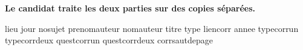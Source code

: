 {\begin{center}
{{\begin{minipage}{\linewidth-3.25cm}
\end{minipage}
	\indexerauteur{}%
	}
	}%
	\newline \smallskip \newline \noindent\textbf{Le candidat traite les deux parties sur des copies séparées.}
	\end{center}\vspace{-0.3cm}
 \indexerquestions{}%
 \compteurquestions{}%
	\clearpage
    }
    	{lieu}			{}
		{jour}			{}
		{nosujet}		{}
		{prenomauteur}	{}
		{nomauteur}		{}
		{titre}			{}
		{type}			{}
		{liencorr}		{}
		{annee}			{}
		{typecorrun}	{}
		{typecorrdeux}	{}
		{questcorrun}	{}
		{questcorrdeux}	{}
		{corrsautdepage}{}

\newcommand{\corrlieu}{\cmdCOR@corr@lieu}
\newcommand{\corrjour}{\cmdCOR@corr@jour}
\newcommand{\corrnosujet}{\cmdCOR@corr@nosujet}
\newcommand{\corrprenomauteur}{\cmdCOR@corr@prenomauteur}
\newcommand{\corrnomauteur}{\cmdCOR@corr@nomauteur}
\newcommand{\corrtitre}{\cmdCOR@corr@titre}
\newcommand{\corrtype}{\cmdCOR@corr@type}
\newcommand{\corrlien}{\cmdCOR@corr@liencorr}
\newcommand{\corrannee}{\cmdCOR@corr@annee}
\newcommand{\corrtypeun}{\cmdCOR@corr@typecorrun}
\newcommand{\corrtypedeux}{\cmdCOR@corr@typecorrdeux}
\newcommand{\corrquestun}{\cmdCOR@corr@questcorrun}
\newcommand{\corrquestdeux}{\cmdCOR@corr@questcorrdeux}
\newcommand{\corrsautdepage}{\cmdCOR@corr@corrsautdepage}

